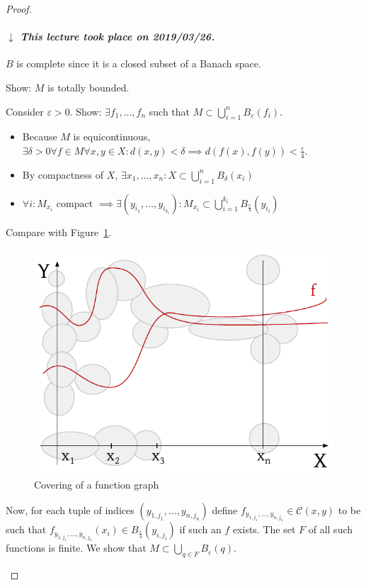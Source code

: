 \documentclass[a4paper]{article}
\numberwithin{lecref}{section}
\newcommand{\dateref}[1]{%
  \begin{mdframed}[backgroundcolor=gray!10,innerbottommargin=0pt,innertopmargin=0pt]
    \paragraph{\textit{$\downarrow$ This lecture took place on #1.}}%
  \end{mdframed}%
}
\begin{document}
\begin{proof}
\begin{enumerate}
\begin{description}
					\dateref{2019/03/26}
					$B$ is complete since it is a closed subset of a Banach space.

					Show: $M$ is totally bounded.

					Consider $\varepsilon > 0$. Show: $\exists f_1, \dots, f_n$ such that $M \subset \bigcup_{i=1}^n B_\varepsilon(f_i)$.

					\begin{itemize}
						\item Because $M$ is equicontinuous, $\exists \delta > 0 \forall f \in M \forall x, y \in X: d(x, y) < \delta \implies d(f(x), f(y)) < \frac\varepsilon4$.
						\item By compactness of $X$, $\exists x_1, \dots, x_n: X \subset \bigcup_{i=1}^n B_\delta(x_i)$
						\item $\forall i: M_{x_i} \text{ compact } \implies \exists (y_{i_1}, \dots, y_{i_{k_i}}): M_{x_i} \subset \bigcup_{i=1}^{k_i} B_{\frac\varepsilon4}(y_{i_i})$
					\end{itemize}

					Compare with Figure~\ref{img:cov}.

					\begin{figure}[t]
						\begin{center}
							\includegraphics{img/covering.pdf}
							\caption{Covering of a function graph}
							\label{img:cov}
						\end{center}
					\end{figure}

					Now, for each tuple of indices $(y_{1,j_1}, \dots, y_{n,j_n})$ define $f_{y_{1,j_1}, \dots, y_{n,j_n}} \in \mathcal C(x, y)$ to be such that $f_{y_{1,j_1},\dots,y_{n,j_n}}(x_i) \in B_{\frac\varepsilon4}(y_{i,j_i})$ if such an $f$ exists. The set $F$ of all such functions is finite. We show that $M \subset \bigcup_{q \in F} B_{\varepsilon}(q)$.


\end{description}
\end{enumerate}
\end{proof}
\end{document}
